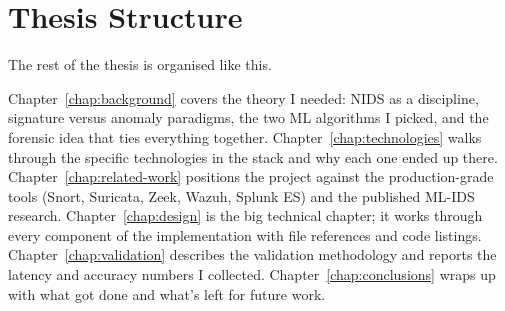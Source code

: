 \section{Thesis Structure}
\label{sec:thesis-structure}

The rest of the thesis is organised like this.

Chapter~\ref{chap:background} covers the theory I needed: NIDS as
a discipline, signature versus anomaly paradigms, the two ML
algorithms I picked, and the forensic idea that ties everything
together. Chapter~\ref{chap:technologies} walks through the
specific technologies in the stack and why each one ended up
there. Chapter~\ref{chap:related-work} positions the project
against the production-grade tools (Snort, Suricata, Zeek, Wazuh,
Splunk ES) and the published ML-IDS research.
Chapter~\ref{chap:design} is the big technical chapter; it works
through every component of the implementation with file
references and code listings. Chapter~\ref{chap:validation}
describes the validation methodology and reports the latency and
accuracy numbers I collected. Chapter~\ref{chap:conclusions}
wraps up with what got done and what's left for future work.
